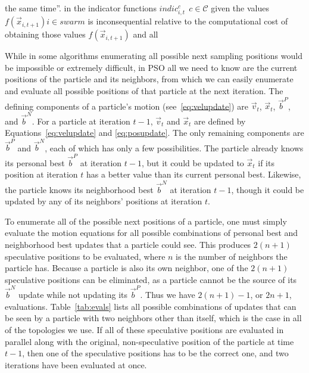 \documentclass[journal,letterpaper]{IEEEtran}
\providecommand{\pers}{\ensuremath{P}}
\providecommand{\neigh}{\ensuremath{N}}
\providecommand{\ppos}{\ensuremath{\Vec{x}}}
\providecommand{\pvel}{\ensuremath{\Vec{v}}}
\providecommand{\nbest}{\ensuremath{\Vec{b}^\neigh}}
\providecommand{\pbest}{\ensuremath{\Vec{b}^\pers}}
\providecommand{\ofunc}{\ensuremath{f}}
\providecommand{\swarm}{\ensuremath{swarm}}
\providecommand{\caseset}{\ensuremath{\mathcal{C}}}
\begin{document}
the same time''. 
in the indicator functions $indic_{i,t}^{c} \ \ c \in \caseset$
given the values $\ofunc(\ppos_{i,t+1}) i \in \swarm$ 
is inconsequential relative to the computational cost of obtaining those values 
$\ofunc(\ppos_{i,t+1})$ and all 



While in some algorithms enumerating all possible next sampling positions would
be impossible or extremely difficult, in PSO all we need to know are the
current positions of the particle and its neighbors, from which we can easily
enumerate and evaluate all possible positions of that particle at the next
iteration.  The defining components of a particle's motion
(see~\eqref{eq:velupdate}) are $\pvel_t$, $\ppos_t$, $\pbest$, and $\nbest$.
For a particle at iteration $t-1$, $\pvel_t$ and $\ppos_t$ are defined by
Equations~\eqref{eq:velupdate} and \eqref{eq:posupdate}.  The only remaining
components are $\pbest$ and $\nbest$, each of which has only a few
possibilities.  The particle already knows its personal best $\pbest$ at
iteration $t-1$, but it could be updated to $\ppos_t$ if its position at
iteration $t$ has a better value than its current personal best.  Likewise, the
particle knows its neighborhood best $\nbest$ at iteration $t-1$, though it
could be updated by any of its neighbors' positions at iteration $t$.

To enumerate all of the possible next positions of a particle, one must simply
evaluate the motion equations for all possible combinations of personal best
and neighborhood best updates that a particle could see.  This produces
$2(n+1)$ speculative positions to be evaluated, where $n$ is the number of
neighbors the particle has.  Because a particle is also its own neighbor, one
of the $2(n+1)$ speculative positions can be eliminated, as a particle cannot
be the source of its $\nbest$ update while not updating its $\pbest$.  Thus we
have $2(n+1)-1$, or $2n+1$, evaluations.  Table~\ref{tab:evals} lists all
possible combinations of updates that can be seen by a particle with two
neighbors other than itself, which is the case in all of the topologies we use.
If all of these speculative positions are evaluated in parallel along with the
original, non-speculative position of the particle at time $t-1$, then one of
the speculative positions has to be the correct one, and two iterations have
been evaluated at once.
\end{document}
